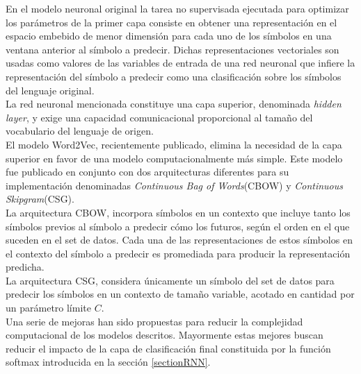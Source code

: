 \documentclass{article}
\begin{document}
	En el modelo neuronal original\cite{37BengioNeuralEmbeding} la tarea no supervisada ejecutada para optimizar los parámetros de la primer capa consiste en obtener una representación en el espacio embebido de menor dimensión para cada uno de los símbolos en una ventana anterior al símbolo a predecir. Dichas representaciones vectoriales son usadas como valores de las variables de entrada de una red neuronal que infiere la representación del símbolo a predecir como una clasificación sobre los símbolos del lenguaje original.\\
	La red neuronal mencionada constituye una capa superior, denominada \textit{hidden layer}, y exige una capacidad comunicacional proporcional al tamaño del vocabulario del lenguaje de origen.\\
	El modelo Word2Vec, recientemente publicado, elimina la necesidad de la capa superior en favor de una modelo computacionalmente más simple. Este modelo fue publicado en conjunto con dos arquitecturas diferentes para su implementación denominadas \textit{Continuous Bag of Words}(CBOW) y \textit{Continuous Skipgram}(CSG).\\
	La arquitectura CBOW, incorpora símbolos en un contexto que incluye tanto los símbolos previos al símbolo a predecir cómo los futuros, según el orden en el que suceden en el set de datos. Cada una de las representaciones de estos símbolos en el contexto del símbolo a predecir es promediada para producir la representación predicha.\\
	La arquitectura CSG, considera únicamente un símbolo del set de datos para predecir los símbolos en un contexto de tamaño variable, acotado en cantidad por un parámetro límite $C$.\\
	Una serie de mejoras han sido propuestas para reducir la complejidad computacional de los modelos descritos\cite{36MikolovImprovement}. Mayormente estas mejores buscan reducir el impacto de la capa de clasificación final constituida por la función softmax introducida en la sección \ref{sectionRNN}.\\
	
\end{document}
